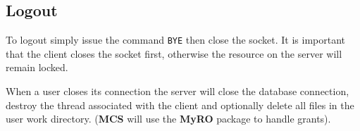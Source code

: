 \documentclass[12pt,titlepage]{article}
\newcommand{\mcs}{\textbf{MCS} }
\newcommand{\myro}{\textbf{MyRO} }
\begin{document}
\subsection{Logout}\label{sec:logout}
To logout simply issue the command \verb|BYE| then close the
socket. It is important that the client closes the socket first,
otherwise the resource on the server will remain locked.

\noindent When a user closes its connection the server will close the
database connection, destroy the thread associated with the client and
optionally delete all files in the user work directory. (\mcs will
use the \myro package to handle grants).
%
%

\newpage
\end{document}

